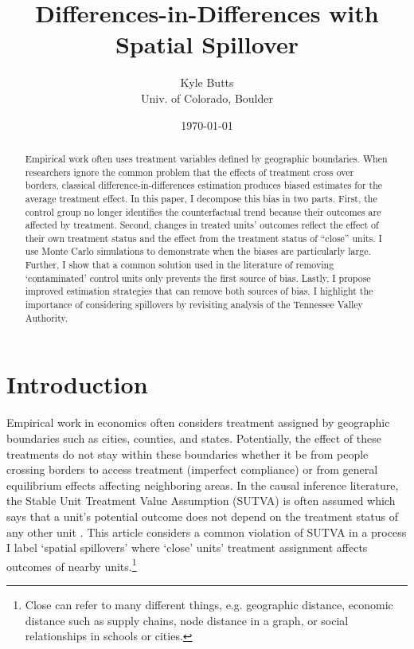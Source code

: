 \documentclass[11pt]{article}
\title{\color{navyblue} Differences-in-Differences with Spatial Spillover}
\author{\normalsize Kyle Butts\\{\footnotesize Univ. of Colorado, Boulder}}
\date{\footnotesize\today}
\begin{document}
\begin{titlepage}
    \maketitle
    
    \begin{abstract}
        Empirical work often uses treatment variables defined by geographic boundaries. When researchers ignore the common problem that the effects of treatment cross over borders, classical difference-in-differences estimation produces biased estimates for the average treatment effect. In this paper, I decompose this bias in two parts. First, the control group no longer identifies the counterfactual trend because their outcomes are affected by treatment. Second, changes in treated units' outcomes reflect the effect of their own treatment status and the effect from the treatment status of ``close'' units. I use Monte Carlo simulations to demonstrate when the biases are particularly large. Further, I show that a common solution used in the literature of removing `contaminated' control units only prevents the first source of bias. Lastly, I propose improved estimation strategies that can remove both sources of bias. I highlight the importance of considering spillovers by revisiting analysis of the Tennessee Valley Authority.
    \end{abstract}
\end{titlepage}

\section{Introduction}

Empirical work in economics often considers treatment assigned by geographic boundaries such as cities, counties, and states. Potentially, the effect of these treatments do not stay within these boundaries whether it be from people crossing borders to access treatment (imperfect compliance) or from general equilibrium effects affecting neighboring areas. In the causal inference literature, the Stable Unit Treatment Value Assumption (SUTVA) is often assumed which says that a unit's potential outcome does not depend on the treatment status of any other unit \citep{Rubin_1980}. This article considers a common violation of SUTVA in a process I label `spatial spillovers' where `close' units' treatment assignment affects outcomes of nearby units.\footnote{Close can refer to many different things, e.g. geographic distance, economic distance such as supply chains, node distance in a graph, or social relationships in schools or cities.} 
\end{document}

